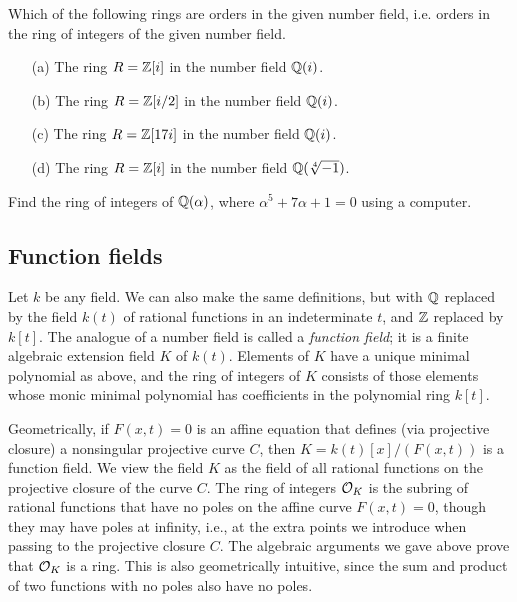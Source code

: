 \begin{exercise}
  Which of the following rings are orders in the given
  number field, i.e. orders in the ring of integers of the
  given number field.
  \begin{enumerate}
    \item[(a)] The ring $R = \mathbb{Z}[i]$ in the number field $\mathbb{Q}(i)$.
    \item[(b)] The ring $R = \mathbb{Z}[i/2]$ in the number field $\mathbb{Q}(i)$.
    \item[(c)] The ring $R = \mathbb{Z}[17i]$ in the number field $\mathbb{Q}(i)$.
    \item[(d)] The ring $R = \mathbb{Z}[i]$ in the number field $\mathbb{Q}(\sqrt[4]{-1})$.
  \end{enumerate}
\end{exercise}

\begin{exercise}
  Find the ring of integers of $\mathbb{Q}(\alpha)$, where $\alpha^5 + 7\alpha + 1 = 0$
  using a computer.
\end{exercise}

\subsection{Function fields}
Let $k$ be any field.  We can also make the same definitions, but with $\mathbb{Q}$
replaced by the field $k(t)$ of rational functions in an indeterminate
$t$, and $\mathbb{Z}$ replaced by $k[t]$.
The analogue of a number field is called a {\em function field}; it is
a finite algebraic extension field $K$ of $k(t)$.  Elements of $K$
have a unique minimal polynomial as above, and the ring of integers of
$K$ consists of those elements whose monic minimal polynomial has
coefficients in the polynomial ring $k[t]$.

Geometrically, if $F(x,t)=0$ is an affine equation that defines (via
projective closure) a nonsingular projective curve $C$, then
$K=k(t)[x]/(F(x,t))$ is a function field.  We view the field $K$ as
the field of all rational functions on the projective closure of the
curve $C$.  The ring of integers $\mathcal{O}_K$ is the subring of rational
functions that have no poles on the affine curve $F(x,t)=0$, though
they may have poles at infinity, i.e., at the extra points we
introduce when passing to the projective closure $C$.  The algebraic
arguments we gave above prove that $\mathcal{O}_K$ is a ring.  This is also
geometrically intuitive, since the sum and product of two functions
with no poles also have no poles.

